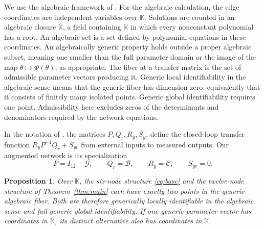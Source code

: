 \documentclass[letterpaper,10pt,conference]{ieeeconf}
\newtheorem{proposition}{Proposition}
\begin{document}
We use the algebraic framework of \cite[Sec.~V]{HMA26}.
For the algebraic calculation, the edge coordinates are independent
variables over \(\mathbb K\). Solutions are counted in an algebraic
closure \(\overline{\mathbb K}\), a field containing \(\mathbb K\)
in which every nonconstant polynomial has a root. An algebraic set is
a set defined by polynomial equations in these coordinates.
An algebraically generic property holds outside a proper algebraic
subset, meaning one smaller than the full parameter domain or the
image of the map \(\theta\mapsto\Phi(\theta)\), as appropriate.
The fiber at a transfer matrix is the set of admissible parameter
vectors producing it.
Generic local identifiability in the algebraic sense means that the
generic fiber has dimension zero, equivalently that it consists of
finitely many isolated points. Generic global identifiability requires
one point. Admissibility here excludes zeros of the determinants and
denominators required by the network equations.

In the notation of \cite{HMA26}, the matrices \(P,Q_r,R_y,S_{yr}\)
define the closed-loop transfer function \(R_yP^{-1}Q_r+S_{yr}\)
from external inputs to measured outputs.
Our augmented network is its specialization
\[
 P=I_{12}-\mathcal G,\qquad Q_r=\mathcal B,\qquad
 R_y=\mathcal C,\qquad S_{yr}=0.
\]

\begin{proposition}\label{prop:field}
Over \(\mathbb K\), the six-node structure \eqref{eq:base} and the
twelve-node structure of Theorem~\ref{thm:main} each have exactly
two points in the generic algebraic fiber. Both are therefore
generically locally identifiable in the algebraic sense and fail
generic global identifiability. If one generic parameter vector has
coordinates in \(\mathbb K\), its distinct alternative also has
coordinates in \(\mathbb K\).
\end{proposition}
\end{document}
